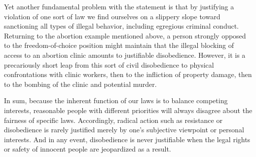 Yet another fundamental problem with the statement is that by justifying a violation of one sort of law we find ourselves on a slippery slope toward sanctioning all types of illegal behavior, including egregious criminal conduct.
Returning to the abortion example mentioned above, a person strongly opposed to the freedom-of-choice position might maintain that the illegal blocking of access to an abortion clinic amounts to justifiable disobedience.
However, it is a precariously short leap from this sort of civil disobedience to physical confrontations with clinic workers, then to the infliction of property damage, then to the bombing of the clinic and potential murder.


In sum, because the inherent function of our laws is to balance competing interests, reasonable people with different priorities will always disagree about the fairness of specific laws.
Accordingly, radical action such as resistance or disobedience is rarely justified merely by one's subjective viewpoint or personal interests.
And in any event, disobedience is never justifiable when the legal rights or safety of innocent people are jeopardized as a result.
